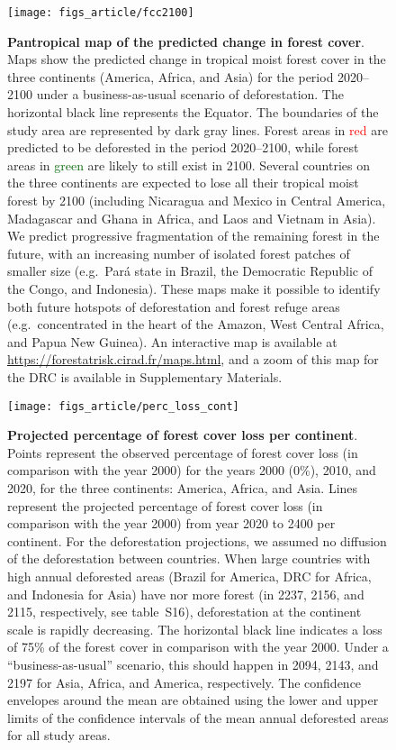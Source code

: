 \documentclass[
  12pt,
]{article}
\begin{document}
\begin{figure}[H]

{\centering \texttt{[image: figs\_article/fcc2100]} 

}

\caption{\textbf{Pantropical map of the predicted change in forest cover}. Maps show the predicted change in tropical moist forest cover in the three continents (America, Africa, and Asia) for the period 2020--2100 under a business-as-usual scenario of deforestation. The horizontal black line represents the Equator. The boundaries of the study area are represented by dark gray lines. Forest areas in \textcolor{red}{red} are predicted to be deforested in the period 2020--2100, while forest areas in \textcolor{darkgreen}{green} are likely to still exist in 2100. Several countries on the three continents are expected to lose all their tropical moist forest by 2100 (including Nicaragua and Mexico in Central America, Madagascar and Ghana in Africa, and Laos and Vietnam in Asia). We predict progressive fragmentation of the remaining forest in the future, with an increasing number of isolated forest patches of smaller size (e.g.~Pará state in Brazil, the Democratic Republic of the Congo, and Indonesia). These maps make it possible to identify both future hotspots of deforestation and forest refuge areas (e.g.~concentrated in the heart of the Amazon, West Central Africa, and Papua New Guinea). An interactive map is available at \url{https://forestatrisk.cirad.fr/maps.html}, and a zoom of this map for the DRC is available in Supplementary Materials.}\label{fig:fcc2100}
\end{figure}



\begin{figure}[H]

{\centering \texttt{[image: figs\_article/perc\_loss\_cont]} 

}

\caption{\textbf{Projected percentage of forest cover loss per continent}. Points represent the observed percentage of forest cover loss (in comparison with the year 2000) for the years 2000 (0\%), 2010, and 2020, for the three continents: America, Africa, and Asia. Lines represent the projected percentage of forest cover loss (in comparison with the year 2000) from year 2020 to 2400 per continent. For the deforestation projections, we assumed no diffusion of the deforestation between countries. When large countries with high annual deforested areas (Brazil for America, DRC for Africa, and Indonesia for Asia) have nor more forest (in 2237, 2156, and 2115, respectively, see table~S16), deforestation at the continent scale is rapidly decreasing. The horizontal black line indicates a loss of 75\% of the forest cover in comparison with the year 2000. Under a ``business-as-usual'' scenario, this should happen in 2094, 2143, and 2197 for Asia, Africa, and America, respectively. The confidence envelopes around the mean are obtained using the lower and upper limits of the confidence intervals of the mean annual deforested areas for all study areas.}\label{fig:perc-loss}
\end{figure}
\end{document}
